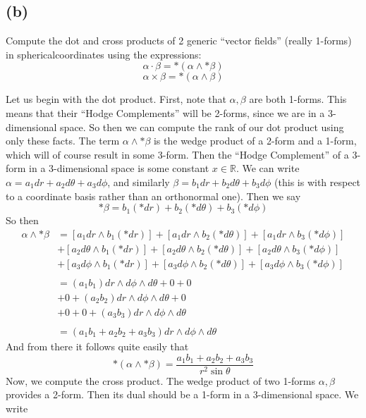 \documentclass{article}
\theoremstyle{definition}
\begin{document}
\subsection*{(b)}
\begin{mdframed}
Compute the dot and cross products of 2 generic “vector fields” (really 1-forms) in sphericalcoordinates using the expressions:
\[
    \alpha \cdot \beta = *(\alpha \wedge *\beta)
\]
\[
    \alpha \times \beta = *(\alpha \wedge \beta)
\]
\end{mdframed}
Let us begin with the dot product. First, note that $\alpha,\beta$ are both 1-forms.
This means that their ``Hodge Complements'' will be 2-forms, since we are in a 3-dimensional space.
So then we can compute the rank of our dot product using only these facts. The term $\alpha \wedge *\beta$
is the wedge product of a 2-form and a 1-form, which will of course result in some 3-form.
Then the ``Hodge Complement'' of a 3-form in a 3-dimensional space is some constant $x \in \mathbb{R}$. 
We can write $\alpha = a_1 dr + a_2  d\theta + a_3 d\phi$, and similarly $\beta = b_1 dr + b_2 d\theta + b_3 d\phi$
(this is with respect to a coordinate basis rather than an orthonormal one).
Then we say
\[
    *\beta = b_1(*dr) + b_2(*d\theta) + b_3(*d\phi)
\]
So then 
\begin{align*}
    \alpha \wedge *\beta &= [a_1 dr \wedge b_1(*dr)] + [a_1 dr \wedge b_2(*d\theta)] + [a_1 dr \wedge b_3(*d\phi)] \\
    & + [a_2 d\theta \wedge b_1(*dr)] + [a_2 d\theta \wedge b_2(*d\theta)] + [a_2 d\theta \wedge b_3(*d\phi)]\\
    & + [a_3 d\phi \wedge b_1(*dr)] + [a_3 d\phi \wedge b_2(*d\theta)] + [a_3 d\phi \wedge b_3(*d\phi)]\\\\
    &= (a_1b_1) dr \wedge d\phi \wedge d\theta + 0 + 0\\
    &+ 0 + (a_2b_2) dr \wedge d\phi \wedge d\theta + 0 \\
    &+ 0 + 0 + (a_3b_3) dr \wedge d\phi \wedge d\theta\\\\
    &=(a_1b_1 + a_2b_2 + a_3b_3)dr \wedge d\phi \wedge d\theta
\end{align*}
And from there it follows quite easily that
\[
    *(\alpha \wedge *\beta) = \frac{a_1b_1 + a_2b_2 + a_3b_3}{r^2\sin\theta}
\]
Now, we compute the cross product. The wedge product of two 1-forms $\alpha, \beta$ provides a 2-form.
Then its dual should be a 1-form in a 3-dimensional space.
We write
\end{document}

